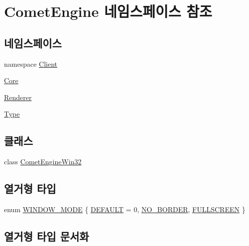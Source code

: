 \hypertarget{namespace_comet_engine}{}\section{Comet\+Engine 네임스페이스 참조}
\label{namespace_comet_engine}
\subsection*{네임스페이스}
\begin{DoxyCompactItemize}
\item 
namespace \hyperlink{namespace_comet_engine_1_1_client}{Client}
\item 
 \hyperlink{namespace_comet_engine_1_1_core}{Core}
\item 
 \hyperlink{namespace_comet_engine_1_1_renderer}{Renderer}
\item 
 \hyperlink{namespace_comet_engine_1_1_type}{Type}
\end{DoxyCompactItemize}
\subsection*{클래스}
\begin{DoxyCompactItemize}
\item 
class \hyperlink{class_comet_engine_1_1_comet_engine_win32}{Comet\+Engine\+Win32}
\end{DoxyCompactItemize}
\subsection*{열거형 타입}
\begin{DoxyCompactItemize}
\item 
enum \hyperlink{namespace_comet_engine_abdc5ec13bf1dfb1d26eb0bcc9da0ddad}{W\+I\+N\+D\+O\+W\+\_\+\+M\+O\+DE} \{ \hyperlink{namespace_comet_engine_abdc5ec13bf1dfb1d26eb0bcc9da0ddada88ec7d5086d2469ba843c7fcceade8a6}{D\+E\+F\+A\+U\+LT} = 0, 
\hyperlink{namespace_comet_engine_abdc5ec13bf1dfb1d26eb0bcc9da0ddada2fcf3c9ce3f39ff118fc4e667c4e2cc6}{N\+O\+\_\+\+B\+O\+R\+D\+ER}, 
\hyperlink{namespace_comet_engine_abdc5ec13bf1dfb1d26eb0bcc9da0ddada5f039f23ee85ddea038ca1ab88ca6755}{F\+U\+L\+L\+S\+C\+R\+E\+EN}
 \}
\end{DoxyCompactItemize}


\subsection{열거형 타입 문서화}
\mbox{\label{namespace_comet_engine_abdc5ec13bf1dfb1d26eb0bcc9da0ddad}} 
